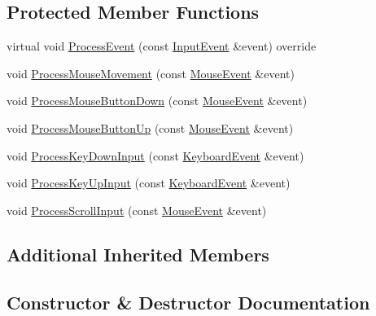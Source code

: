 \subsection*{Protected Member Functions}
\begin{DoxyCompactItemize}
\item 
virtual void \mbox{\hyperlink{classec_1_1_camera_controller_a0e2d455602581a484daf81bdb60a01bc}{Process\+Event}} (const \mbox{\hyperlink{structec_1_1_input_event}{Input\+Event}} \&event) override
\item 
void \mbox{\hyperlink{classec_1_1_camera_controller_a9983bbcea89e8b0607f48a69e5d91fb5}{Process\+Mouse\+Movement}} (const \mbox{\hyperlink{structec_1_1_mouse_event}{Mouse\+Event}} \&event)
\item 
void \mbox{\hyperlink{classec_1_1_camera_controller_a079ec204c0825113af01b5b79c005eb1}{Process\+Mouse\+Button\+Down}} (const \mbox{\hyperlink{structec_1_1_mouse_event}{Mouse\+Event}} \&event)
\item 
void \mbox{\hyperlink{classec_1_1_camera_controller_a6d1e11850e9a567878a2ee458916e57a}{Process\+Mouse\+Button\+Up}} (const \mbox{\hyperlink{structec_1_1_mouse_event}{Mouse\+Event}} \&event)
\item 
void \mbox{\hyperlink{classec_1_1_camera_controller_a21aade7a480bdb8b9fdafcd00af07603}{Process\+Key\+Down\+Input}} (const \mbox{\hyperlink{structec_1_1_keyboard_event}{Keyboard\+Event}} \&event)
\item 
void \mbox{\hyperlink{classec_1_1_camera_controller_a0835439332db0736a86ec307ef73f3fc}{Process\+Key\+Up\+Input}} (const \mbox{\hyperlink{structec_1_1_keyboard_event}{Keyboard\+Event}} \&event)
\item 
void \mbox{\hyperlink{classec_1_1_camera_controller_a5eb27728bfc35a025220b3274b768b5c}{Process\+Scroll\+Input}} (const \mbox{\hyperlink{structec_1_1_mouse_event}{Mouse\+Event}} \&event)
\end{DoxyCompactItemize}
\subsection*{Additional Inherited Members}


\subsection{Constructor \& Destructor Documentation}
\mbox{\label{classec_1_1_camera_controller_a53fd061c49374fd8f1194cecac1e35aa}} 
